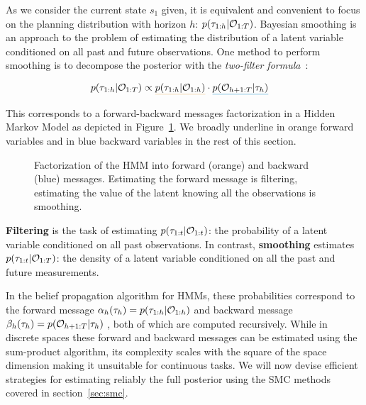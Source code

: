 As we consider the current state $s_1$ given, it is equivalent and convenient to focus on the planning distribution with horizon $h$: $p(\tau_{1:h}|{\mathcal{O}}_{1:T})$. Bayesian smoothing is an approach to the problem of estimating the distribution of a latent variable conditioned on all past and future observations. One method to perform smoothing is to decompose the posterior with the \textit{two-filter formula}~\citep{bresler1986two, kitagawa1994two}:


\begin{align}
\label{eq:forwardbackward}
    {p(\traj_{1:h} | \gO_{1:T})} & \propto \mathunderline{alpha}{p(\traj_{1:h}|\gO_{1:h})} \cdot \mathunderline{beta}{p(\gO_{h+1:T}|\traj_{h})}
\end{align}





\noindent This corresponds to a forward-backward messages factorization in a
Hidden Markov Model as depicted in Figure~\ref{fig:alphabeta}. We broadly underline in orange forward variables and in blue backward variables in the rest of this section.




\setlength{\wrapoverhang}{\marginparwidth}
\addtolength{\wrapoverhang}{\marginparsep}
\begin{figure}%
\centering
\resizebox{.95\linewidth}{!}{

}
\caption{Factorization of the HMM into  {\color{alpha} forward} (orange) and {\color{beta} backward} (blue) messages. Estimating the forward message is filtering, estimating the value of the latent knowing all the observations is smoothing.}
\label{fig:alphabeta}
\end{figure}

\textbf{Filtering} is the task of estimating $p(\tau_{1:t} | {\mathcal{O}}_{1:t})$: the probability of a latent variable conditioned on all past observations. In contrast, \textbf{smoothing} estimates $p(\tau_{1:t} | {\mathcal{O}}_{1:T})$: the density of a latent variable conditioned on all the past and future measurements. 

In the belief propagation algorithm for HMMs, these probabilities correspond to the forward message $\alpha_{h}(\tau_{h}) = p(\tau_{1:h}|{\mathcal{O}}_{1:h})$ and backward message $\beta_{h}(\tau_{h}) = {p({\mathcal{O}}_{h+1:T}|\tau_{h})}$ , both of which are computed recursively.
While in discrete spaces these forward and backward messages can be estimated using the sum-product algorithm, its complexity scales with the square of the space dimension making it unsuitable for continuous tasks. We will now devise efficient strategies for estimating reliably the full posterior using the SMC methods covered in section~\ref{sec:smc}.



